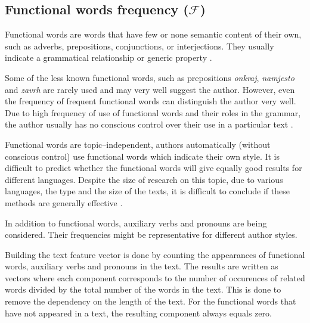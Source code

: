 \documentclass[11pt,english]{article}
\begin{document}
\begin{multicols}{2}


\subsection{Functional words frequency ($\mathcal{F}$)}
\label{sec:funkcijske-rijeci}
Functional words are words that have few or none semantic content of their
own, such as adverbs, prepositions, conjunctions, or interjections. They usually
indicate a grammatical relationship or generic property
\citep{zhao2005effective}.

Some of the less known functional words, such as prepositions \emph{onkraj},
\emph{namjesto} and \emph{zavrh} are rarely used and may very well suggest the
author. However, even the frequency of frequent functional words can distinguish the author very well. Due to high frequency of use of
functional words and their roles in the grammar, the author usually has no
conscious control over their use in a particular text
\citep{argamon2005measuring}.

Functional words are topic--independent, authors automatically (without conscious
control) use functional words which indicate their own style.
It is difficult to predict whether the functional words will give equally good
results for different languages. Despite the size of research on this
topic, due to various languages, the type and the size of the texts, it is
difficult to conclude if these methods are generally effective \citep{zhao2005effective}.

In addition to functional words, auxiliary verbs and pronouns are being
considered. Their frequencies might be representative for different
author styles.

Building the text feature vector is done by counting the appearances
of functional words, auxiliary verbs and pronouns in the text. The results
are written as vectors where each component corresponds to the number of occurences of
related words divided by the total number of the words in the text. This is done
to remove the dependency on the length of the text. For the functional words that
have not appeared in a text, the resulting component always equals zero.


\end{multicols}
\end{document}
